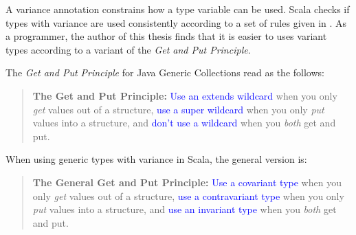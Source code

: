 A variance annotation constrains how a type variable can be used.  
Scala checks if types with variance are 
used consistently according to a set of rules given in \citep[Section 
4.5]{scala_specification}.  As a programmer, the author of this thesis 
finds that it is easier to uses variant types according to a variant of the 
{\it Get and Put Principle}.
\newpage

The {\it Get and Put Principle} for Java Generic Collections \citep[Section 
2.4]{JGC} read as the follows:
\begin{quotation}
{\bf The Get and Put Principle:} \textcolor{blue}{Use an extends wildcard}
when you only {\it get} values out of a structure, \textcolor{blue}{use a super 
wildcard} when you only {\it put} values into a structure, and \textcolor{blue}{don't 
use a wildcard } when you  {\it both}  get and put.
\end{quotation}

When using generic types with variance in Scala, the general version is: 

\begin{quotation}
{\bf The General Get and Put Principle:} \textcolor{blue}{Use a covariant type}
when you only {\it get} values out of a structure, \textcolor{blue}{use a contravariant type}
when you only  {\it put}  values into a structure, 
and \textcolor{blue}{use an invariant type} when you  {\it both}  get and put.
\end{quotation}

\begin{comment}
  \begin{figure}[t]
  \begin{lstlisting}[language=scala, escapechar=?]
trait Stack[+E] {
  def empty():Boolean
//  def push(elt:E):Unit  // covariant type E occurs in contravariant position in type E of value  elt
  def pop():E
}

trait Stack[-E] {
  def empty():Boolean
  def push(elt:E):Unit  
//  def pop():E // contravariant type E occurs in covariant position in type ()E of method pop
}
  \end{lstlisting}


  \caption{Scala Example: Stack with variance}
  \label{scala_variance}
\end{figure}
\end{comment}

